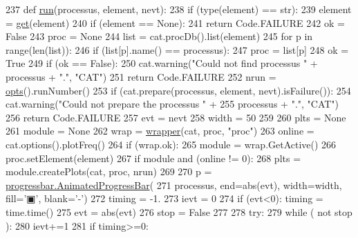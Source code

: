 \begin{DoxyCode}
237 \textcolor{keyword}{def }\hyperlink{namespaceshell_ac89ea08a5e75ecb222fe9e707b3ee102}{run}(processus, element, nevt):
238   \textcolor{keywordflow}{if} (type(element) == str):
239     element = \hyperlink{namespaceshell_a4b477089a422d9adc38334764718c485}{get}(element)
240     \textcolor{keywordflow}{if} (element == \textcolor{keywordtype}{None}):
241       \textcolor{keywordflow}{return} Code.FAILURE
242   ok = \textcolor{keyword}{False}
243   proc = \textcolor{keywordtype}{None}
244   list = cat.procDb().list(element)
245   \textcolor{keywordflow}{for} p \textcolor{keywordflow}{in} range(len(list)):
246     \textcolor{keywordflow}{if} (list[p].name() == processus):
247       proc = list[p]
248       ok = \textcolor{keyword}{True}
249   \textcolor{keywordflow}{if} (ok == \textcolor{keyword}{False}):
250     cat.warning(\textcolor{stringliteral}{"Could not find processus "} + processus + \textcolor{stringliteral}{"."}, \textcolor{stringliteral}{"CAT"})
251     \textcolor{keywordflow}{return} Code.FAILURE
252   nrun = \hyperlink{namespaceshell_ac20d6d8d358a08b077ebca4dc98eca96}{opts}().runNumber()
253   \textcolor{keywordflow}{if} (cat.prepare(processus, element, nevt).isFailure()):
254     cat.warning(\textcolor{stringliteral}{"Could not prepare the processus "} +
255                 processus + \textcolor{stringliteral}{"."}, \textcolor{stringliteral}{"CAT"})
256     \textcolor{keywordflow}{return} Code.FAILURE
257   evt = nevt
258   width = 50
259 
260   plts   = \textcolor{keywordtype}{None}
261   module = \textcolor{keywordtype}{None}
262   wrap = \hyperlink{namespacewrapper}{wrapper}(cat, proc, \textcolor{stringliteral}{"proc"})
263   online  = cat.options().plotFreq()
264   \textcolor{keywordflow}{if} (wrap.ok):
265     module = wrap.GetActive()
266     proc.setElement(element)
267     \textcolor{keywordflow}{if} module \textcolor{keywordflow}{and} (online != 0):
268       plts = module.createPlots(cat, proc, nrun)        
269     
270   p = \hyperlink{classprogressbar_1_1AnimatedProgressBar}{progressbar.AnimatedProgressBar}(
271       processus, end=abs(evt), width=width, fill=\textcolor{stringliteral}{'▣'}, blank=\textcolor{stringliteral}{'-'})
272   timing  = -1.
273   ievt    = 0
274   \textcolor{keywordflow}{if} (evt<0): timing = time.time()
275   evt    = abs(evt)
276   stop    = \textcolor{keyword}{False}
277 
278   \textcolor{keywordflow}{try}:
279     \textcolor{keywordflow}{while} ( \textcolor{keywordflow}{not} stop ):
280       ievt+=1
281       \textcolor{keywordflow}{if} timing>=0:

\end{DoxyCode}
